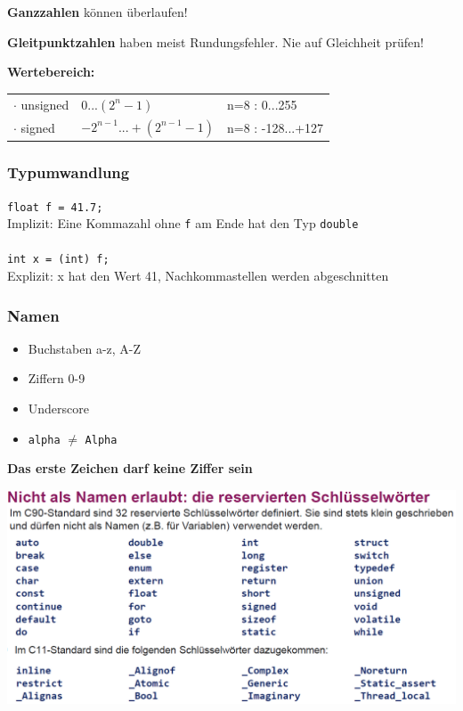  			\textbf{Ganzzahlen} können überlaufen!

			\textbf{Gleitpunktzahlen} haben meist Rundungsfehler. Nie auf Gleichheit prüfen!

			\textbf{Wertebereich:} \\
			\begin{tabular}{lll}
				$\cdot$ unsigned & 0...$(2^n-1)$               & n=8 : 0...255 \\
				$\cdot$ signed   & $-2^{n-1}...+(2^{n-1}-1)$ & n=8 : -128...+127 \\
			\end{tabular}

		\subsubsection{Typumwandlung}
			\verb|float f = 41.7;|\\
			Implizit: Eine Kommazahl ohne \verb|f| am Ende hat den Typ \verb|double|
			\\
			\\
			\verb|int x = (int) f;|\\
			Explizit: x hat den Wert 41, Nachkommastellen werden abgeschnitten

		\subsubsection{Namen}
			\begin{minipage}{0.35\linewidth}
				\begin{itemize}
					\item Buchstaben a-z, A-Z
					\item Ziffern 0-9
					\item Underscore
					\item \verb|alpha| $\neq$ \verb|Alpha|
				\end{itemize}
				\textbf{Das erste Zeichen darf keine Ziffer sein}
			\end{minipage}
			\hfill
			\begin{minipage}{0.6\linewidth}
				\includegraphics[width=1\linewidth]{Bilder/verbotene_namen.png}
			\end{minipage}


